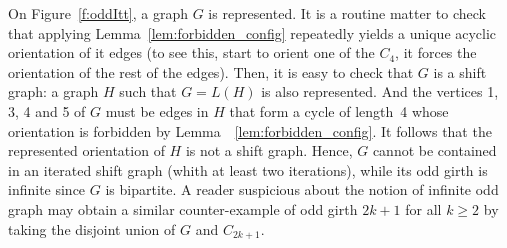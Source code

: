 \documentclass[11pt,a4aper]{article}
\renewcommand{\geq}{\geqslant}
\begin{document}
On Figure~\ref{f:oddItt}, a graph $G$ is represented. It is a routine
matter to check that applying Lemma~\ref{lem:forbidden_config}
repeatedly yields a unique acyclic orientation of it edges (to see
this, start to orient one of the $C_4$, it forces the orientation of
the rest of the edges).  Then, it is easy to check that $G$ is a shift
graph: a graph $H$ such that $G = L(H)$ is also represented.  And the
vertices 1, 3, 4 and 5 of $G$ must be edges in $H$ that form a cycle
of length~4 whose orientation is forbidden by
Lemma~~\ref{lem:forbidden_config}.  It follows that the represented
orientation of $H$ is not a shift
graph.  Hence, $G$ cannot be contained in an iterated shift graph
(whith at least two iterations),
while its odd girth is infinite since $G$ is bipartite.
A reader suspicious about the notion of infinite odd graph may obtain
a similar counter-example of odd girth $2k+1$ for all $k\geq 2$ by
taking the disjoint union of $G$ and $C_{2k+1}$.  
\end{document}
